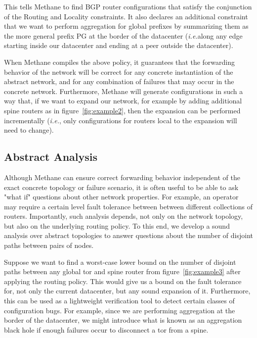 \documentclass{sig-alternate-10pt}
\newcommand{\IE}{\emph{i.e.}}
\newcommand{\sysname}{{\small \sf Methane}\xspace}
\begin{document}
This tells \sysname to find BGP router configurations that satisfy the conjunction of the Routing and Locality constraints. It also declares an additional constraint that we want to perform aggregation for global prefixes by summarizing them as the more general prefix PG at the border of the datacenter (\IE along any edge starting inside our datacenter and ending at a peer outside the datacenter).

When \sysname compiles the above policy, it guarantees that the forwarding behavior of the network will be correct for any concrete instantiation of the abstract network, and for any combination of failures that may occur in the concrete network. Furthermore, \sysname will generate configurations in such a way that, if we want to expand our network, for example by adding additional spine routers as in figure~\ref{fig:example2}, then the expansion can be performed incrementally (\IE, only configurations for routers local to the expansion will need to change).

\subsection{Abstract Analysis}

Although \sysname can ensure correct forwarding behavior independent of the exact concrete topology or failure scenario, it is often useful to be able to ask "what if" questions about other network properties. For example, an operator may require a certain level fault tolerance between between different collections of routers. Importantly, such analysis depends, not only on the network topology, but also on the underlying routing policy. To this end, we develop a sound analysis over abstract topologies to answer questions about the number of disjoint paths between pairs of nodes.

Suppose we want to find a worst-case lower bound on the number of disjoint paths between any global tor and spine router from figure~\ref{fig:example3} after applying the routing policy. This would give us a bound on the fault tolerance for, not only the current datacenter, but any sound expansion of it. Furthermore, this can be used as a lightweight verification tool to detect certain classes of configuration bugs. For example, since we are performing aggregation at the border of the datacenter, we might introduce what is known as an aggregation black hole if enough failures occur to disconnect a tor from a spine.
\end{document}
